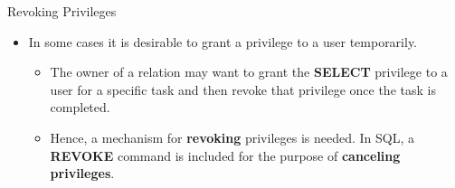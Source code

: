 \begin{frame}{Revoking Privileges}
    \Large %
    
    \begin{itemize}
        \vspace{-1.5cm} %
        
        \item In some cases it is desirable to grant a privilege to a user temporarily.
        
        \begin{itemize}
            \large %
            \setlength{\itemsep}{0.3cm} %
            
            \item The owner of a relation may want to grant the \textbf{SELECT} privilege to a user for a specific task and then revoke that privilege once the task is completed.
            
            \item Hence, a mechanism for \textbf{revoking} privileges is needed. In SQL, a \textbf{REVOKE} command is included for the purpose of \textbf{canceling privileges}.
        \end{itemize}
        
    \end{itemize}
\end{frame}


